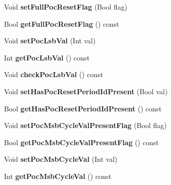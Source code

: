 \begin{DoxyCompactItemize}
Void {\bfseries set\+Full\+Poc\+Reset\+Flag} (Bool flag)
\item 
\mbox{\label{class_t_com_slice_a45b5dfe45f96052226365b078c85ff17}} 
Bool {\bfseries get\+Full\+Poc\+Reset\+Flag} () const
\item 
\mbox{\label{class_t_com_slice_a5c331bd2e942ecdaff6f1497d042b91a}} 
Void {\bfseries set\+Poc\+Lsb\+Val} (Int val)
\item 
\mbox{\label{class_t_com_slice_a7ae8c56d166794ac853a7811a2131461}} 
Int {\bfseries get\+Poc\+Lsb\+Val} () const
\item 
\mbox{\label{class_t_com_slice_ae30399b0c243055f601fa6486adae509}} 
Void {\bfseries check\+Poc\+Lsb\+Val} () const
\item 
\mbox{\label{class_t_com_slice_a90c45479b12a03f26d85ec78de64511b}} 
Void {\bfseries set\+Has\+Poc\+Reset\+Period\+Id\+Present} (Bool val)
\item 
\mbox{\label{class_t_com_slice_abdc8467f7d242a10498af8bb3ad965e9}} 
Bool {\bfseries get\+Has\+Poc\+Reset\+Period\+Id\+Present} () const
\item 
\mbox{\label{class_t_com_slice_a5b0ed18628be5dc6b90375379ec3a885}} 
Void {\bfseries set\+Poc\+Msb\+Cycle\+Val\+Present\+Flag} (Bool flag)
\item 
\mbox{\label{class_t_com_slice_a5605872c64120b9c3b4d8aa52186a842}} 
Bool {\bfseries get\+Poc\+Msb\+Cycle\+Val\+Present\+Flag} () const
\item 
\mbox{\label{class_t_com_slice_ae76942ed32f0757eb4e768302ea734ae}} 
Void {\bfseries set\+Poc\+Msb\+Cycle\+Val} (Int val)
\item 
\mbox{\label{class_t_com_slice_ae69f0beb0146d59b28f3147de910ee50}} 
Int {\bfseries get\+Poc\+Msb\+Cycle\+Val} () const
\item 
\mbox{\label{class_t_com_slice_aab953dcddc37c8d6b7a5135485006f51}} 

\end{DoxyCompactItemize}
